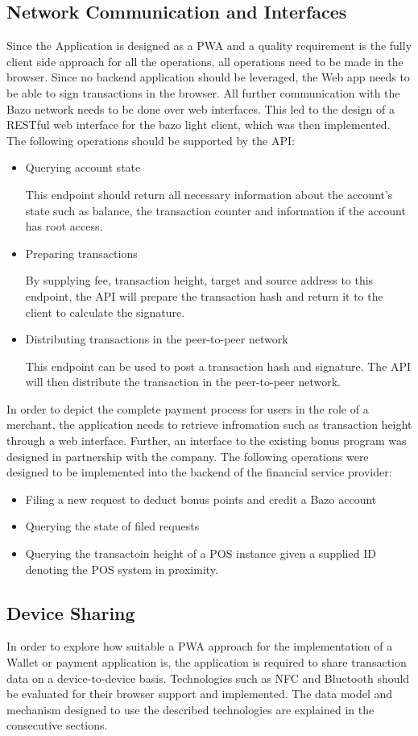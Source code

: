 \subsection{Network Communication and Interfaces}\label{networkandinterfaces}
Since the Application is designed as a PWA and a quality requirement is the fully client side approach for all the operations, all operations need to be made in the browser. Since no backend application should be leveraged, the Web app needs to be able to sign transactions in the browser. All further communication with the Bazo network needs to be done over web interfaces. This led to the design of a RESTful web interface for the bazo light client, which was then implemented. The following operations should be supported by the API:
\begin{itemize}
\item Querying account state

This endpoint should return all necessary information about the account's state such as balance, the transaction counter and information if the account has root access.
\item Preparing transactions

By supplying fee, transaction height, target and source address to this endpoint, the API will prepare the transaction hash and return it to the client to calculate the signature.
\item Distributing transactions in the peer-to-peer network

This endpoint can be used to post a transaction hash and signature. The API will then distribute the transaction in the peer-to-peer network.
\end{itemize}
In order to depict the complete payment process for users in the role of a merchant, the application needs to retrieve infromation such as transaction height through a web interface. Further, an interface to the existing bonus program was designed in partnership with the company. The following operations were designed to be implemented into the backend of the financial service provider:
\begin{itemize}
\item Filing a new request to deduct bonus points and credit a Bazo account
\item Querying the state of filed requests
\item Querying the transactoin height of a POS instance given a supplied ID denoting the POS system in proximity.
\end{itemize}
\subsection{Device Sharing}
In order to explore how suitable a PWA approach for the implementation of a Wallet or payment application is, the application is required to share transaction data on a device-to-device basis. Technologies such as NFC and Bluetooth should be evaluated for their browser support and implemented. 
The data model and mechanism designed to use the described technologies are explained in the consecutive sections.
